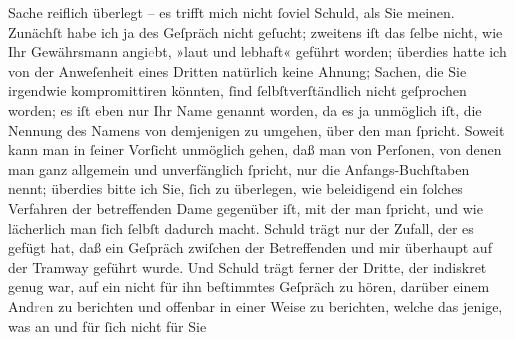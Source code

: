\begin{ledgroupsized}[t]{13cm}
               Sache reiflich überlegt – es trifft mich nicht ſoviel Schuld, als Sie meinen.
               Zunächſt habe ich ja des Geſpräch nicht geſucht; zweitens iſt das ſelbe nicht, wie
               Ihr Gewährsmann
                  angi\textcolor{gray}{e}bt, »laut und lebhaft« geführt worden; überdies hatte ich
               von der Anweſenheit eines Dritten natürlich keine Ahnung; Sachen, die Sie irgendwie kompromittiren
               könnten, ſind ſelbſtverſtändlich nicht geſprochen worden; es iſt eben nur Ihr Name
               genannt worden, da es ja unmöglich iſt, die Nennung des Namens von demjenigen zu
               umgehen, über den man ſpricht. Soweit kann man in ſeiner Vorſicht unmöglich gehen,
               daß man von Perſonen, von denen man ganz {\pb}allgemein
               und unverfänglich ſpricht, nur die Anfangs-Buchſtaben nennt; überdies bitte ich Sie,
               ſich zu überlegen, wie beleidigend ein ſolches Verfahren der betreffenden Dame gegenüber iſt, mit der
               man ſpricht, und wie lächerlich man ſich ſelbſt dadurch macht. Schuld trägt nur der
               Zufall, der es gefügt hat, daß ein Geſpräch zwiſchen der Betreffenden und mir überhaupt auf der
               Tramway geführt wurde. Und Schuld trägt ferner der Dritte, der indiskret genug war, auf ein
               nicht für ihn beſtimmtes Geſpräch zu hören, darüber einem And\textcolor{gray}{re}n
               zu berichten und offenbar in einer Weise zu berichten, welche das jenige, was an  und für ſich nicht \introOben{}für Sie\introOben{}

\end{ledgroupsized}
